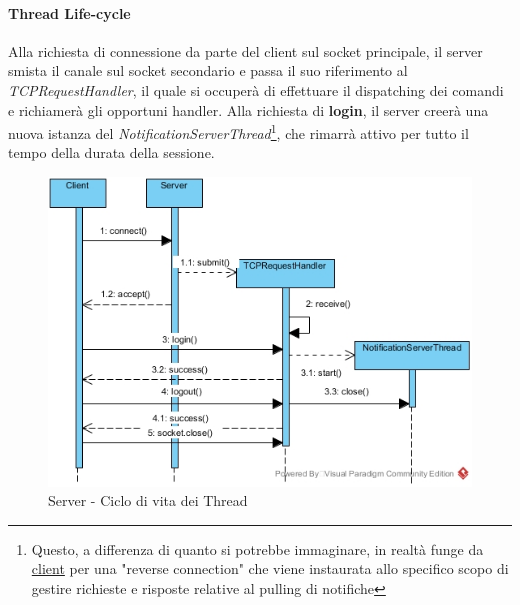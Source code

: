 \paragraph{Thread Life-cycle}
Alla richiesta di connessione da parte del client sul socket principale, il server smista il canale sul socket secondario e passa il suo riferimento al \textit{TCPRequestHandler}, il quale si occuperà di effettuare il dispatching dei comandi e richiamerà gli opportuni handler. Alla richiesta di \textbf{login}, il server creerà una nuova istanza del \textit{NotificationServerThread}\footnote{Questo, a differenza di quanto si potrebbe immaginare, in realtà funge da \underline{client} per una "reverse connection" che viene instaurata allo specifico scopo di gestire richieste e risposte relative al pulling di notifiche}, che rimarrà attivo per tutto il tempo della durata della sessione.
\begin{figure}[h]
	\caption{Server - Ciclo di vita dei Thread}
	\centering
	\includegraphics[scale=0.5]{assets/server/thread_activation_sequence_diagram}
\end{figure}